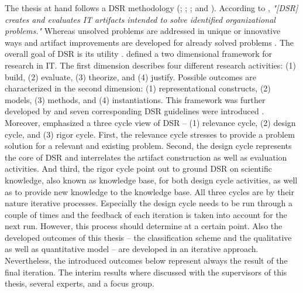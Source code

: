 The thesis at hand follows a \ac{DSR} methodology (\citealp{March1995}; \citealp{Hevner2004}; \citealp{Hevner2007}; and \citealp{Peffers2007}). According to \citet[p. 77]{Hevner2004}, \textit{"[\ac{DSR}] creates and evaluates IT artifacts intended to solve identified organizational problems."} Whereas unsolved problems are addressed in unique or innovative ways and artifact improvements are developed for already solved problems \citep[p. 81]{Hevner2004}. The overall goal of \ac{DSR} is its utility \citep[p. 80]{Hevner2004}.
\citet[pp. 255-262]{March1995} defined a two dimensional framework for research in \ac{IT}. The first dimension describes four different research activities: (1) build, (2) evaluate, (3) theorize, and (4) justify. Possible outcomes are characterized in the second dimension: (1) representational constructs, (2) models, (3) methods, and (4) instantiations. This framework was further developed by \citet[pp. 78-81]{Hevner2004} and seven corresponding \ac{DSR} guidelines were introduced \citep[pp. 82-90]{Hevner2004}. Moreover, \citet[pp. 87-92]{Hevner2007} emphasized a three cycle view of \ac{DSR} -- (1) relevance cycle, (2) design cycle, and (3) rigor cycle. First, the relevance cycle stresses to provide a problem solution for a relevant and existing problem. Second, the design cycle represents the core of \ac{DSR} and interrelates the artifact construction as well as evaluation activities. And third, the rigor cycle point out to ground \ac{DSR} on scientific knowledge, also known as knowledge base, for both design cycle activities, as well as to provide new knowledge to the knowledge base. All three cycles are by their nature iterative processes. Especially the design cycle needs to be run through a couple of times and the feedback of each iteration is taken into account for the next run. However, this process should determine at a certain point. Also the developed outcomes of this thesis -- the classification scheme and the qualitative as well as quantitative model -- are developed in an iterative approach. Nevertheless, the introduced outcomes below represent always the result of the final iteration. The interim results where discussed with the supervisors of this thesis, several experts, and a focus group.

